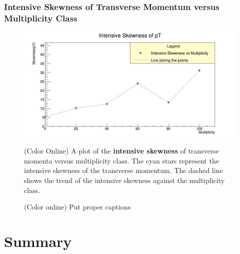 \documentclass[letterpaper,aps,prc,superscriptaddress,nofootinbib,10pt,showpacs,floatfix]{revtex4-2}%
\begin{document}
\subsubsection{Intensive Skewness of Transverse Momentum versus Multiplicity Class}
\label{subsubsec:intskew}
\vspace{-5mm}
\begin{figure}[!htb]
\begin{minipage}{\textwidth}
   \label{Fig:9}
     \centering
     \renewcommand{\thefigure}{9}
     \includegraphics[width=\linewidth]{intskew}
     \begin{minipage}{0.8\textwidth}
     \caption{(Color Online) A plot of the \textbf{intensive skewness} of transverse momenta versus multiplicity class. The cyan stars represent the intensive skewness of the transverse momentum. The dashed line shows the trend of the intensive skewness against the multiplicity class.}
     \end{minipage}
     
\end{minipage}
\end{figure}

\pagebreak








\newpage
\begin{figure}
\begin{center}
\caption{(Color online) Put proper captions}
\label{f1}
\end{center}
\end{figure}









\section{Summary}
\end{document}
